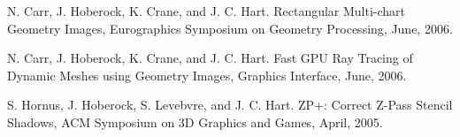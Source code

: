 \documentclass[margin,line]{res}
\begin{document}
\begin{resume}
\vspace{-.275cm}
N. Carr, J. Hoberock, K. Crane, and J. C. Hart.
Rectangular Multi-chart Geometry Images, Eurographics Symposium
on Geometry Processing, June, 2006.

\vspace{-.275cm}
N. Carr, J. Hoberock, K. Crane, and J. C. Hart. Fast
GPU Ray Tracing of Dynamic Meshes using Geometry Images, Graphics
Interface, June, 2006.

\vspace{-.275cm}
S. Hornus, J. Hoberock, S. Levebvre, and J. C. Hart.
ZP+: Correct Z-Pass Stencil Shadows, ACM Symposium on 3D
Graphics and Games, April, 2005.

\end{resume}
\end{document}
